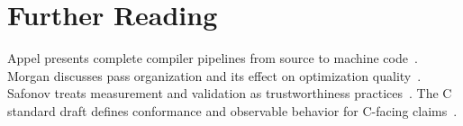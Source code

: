 \section{Further Reading}\label{sec:ch38-reading}

Appel presents complete compiler pipelines from source to machine code~\cite{appel-1998-modern}.
Morgan discusses pass organization and its effect on optimization quality~\cite{morgan-1998-optimizing}.
Safonov treats measurement and validation as trustworthiness practices~\cite{safonov-2010-trustworthy}.
The C standard draft defines conformance and observable behavior for C-facing claims~\cite{wg14-2011-c11}.
